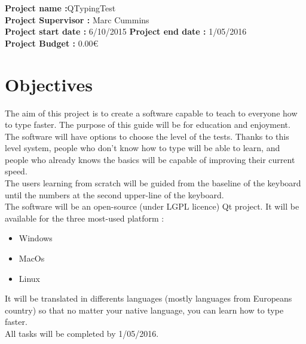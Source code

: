 
\textbf{Project name :}QTypingTest \\
\textbf{Project Supervisor :} Marc Cummins \\
\textbf{Project start date : } 6/10/2015
\textbf{Project end date : }1/05/2016 \\
\textbf{Project Budget :} 0.00€ \\

\chapter{Objectives}
The aim of this project is to create a software capable to teach to everyone how to type faster.
The purpose of this guide will be for education and enjoyment.\\
The software will have options to choose the level of the tests. Thanks to this level system, people who don't know how to type will
be able to learn, and people who already knows the basics will be capable of improving their current speed.\\
The users learning from scratch will be guided from the baseline of the keyboard until the numbers at the second upper-line of the keyboard.\\
The software will be an open-source (under LGPL licence) Qt project. It will be available for the three most-used platform : 
\begin{itemize}
	\item Windows
	\item MacOs
	\item Linux
\end{itemize}
 It will be translated in differents
languages (mostly languages from Europeans country) so that no matter your native language, you can learn how to type faster.\\
All tasks will be completed by 1/05/2016.

